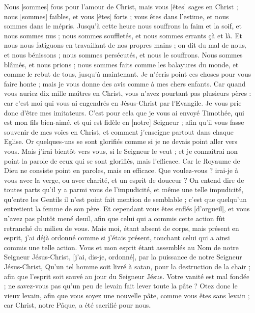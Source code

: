 \begin{multicols}{2}
Nous [sommes] fous pour l'amour de Christ, mais vous [êtes] sages en Christ ; nous [sommes] faibles, et vous [êtes] forts ; vous êtes dans l'estime, et nous sommes dans le mépris.
Jusqu'à cette heure nous souffrons la faim et la soif, et nous sommes nus ; nous sommes souffletés, et nous sommes errants çà et là.
Et nous nous fatiguons en travaillant de nos propres mains ; on dit du mal de nous, et nous bénissons ; nous sommes persécutés, et nous le souffrons.
Nous sommes blâmés, et nous prions ; nous sommes faits comme les balayures du monde, et comme le rebut de tous, jusqu'à maintenant.
Je n'écris point ces choses pour vous faire honte ; mais je vous donne des avis comme à mes chers enfants.
Car quand vous auriez dix mille maîtres en Christ, vous n'avez pourtant pas plusieurs pères : car c'est moi qui vous ai engendrés en Jésus-Christ par l'Evangile.
Je vous prie donc d'être mes imitateurs.
C'est pour cela que je vous ai envoyé Timothée, qui est mon fils bien-aimé, et qui est fidèle en [notre] Seigneur ; afin qu'il vous fasse souvenir de mes voies en Christ, et comment j'enseigne partout dans chaque Eglise.
Or quelques-uns se sont glorifiés comme si je ne devais point aller vers vous.
Mais j'irai bientôt vers vous, si le Seigneur le veut ; et je connaîtrai non point la parole de ceux qui se sont glorifiés, mais l'efficace.
Car le Royaume de Dieu ne consiste point en paroles, mais en efficace.
Que voulez-vous ? irai-je à vous avec la verge, ou avec charité, et un esprit de douceur ?
\VerseOne{}On entend dire de toutes parts qu'il y a parmi vous de l'impudicité, et même une telle impudicité, qu'entre les Gentils il n'est point fait mention de semblable ; c'est que quelqu'un entretient la femme de son père.
Et cependant vous êtes enflés [d'orgueil], et vous n'avez pas plutôt mené deuil, afin que celui qui a commis cette action fût retranché du milieu de vous.
Mais moi, étant absent de corps, mais présent en esprit, j'ai déjà ordonné comme si j'étais présent, touchant celui qui a ainsi commis une telle action.
Vous et mon esprit étant assemblés au Nom de notre Seigneur Jésus-Christ, [j'ai, dis-je, ordonné], par la puissance de notre Seigneur Jésus-Christ,
Qu'un tel homme soit livré à satan, pour la destruction de la chair ; afin que l'esprit soit sauvé au jour du Seigneur Jésus.
Votre vanité est mal fondée ; ne savez-vous pas qu'un peu de levain fait lever toute la pâte ?
Otez donc le vieux levain, afin que vous soyez une nouvelle pâte, comme vous êtes sans levain ; car Christ, notre Pâque, a été sacrifié pour nous.

\end{multicols}
